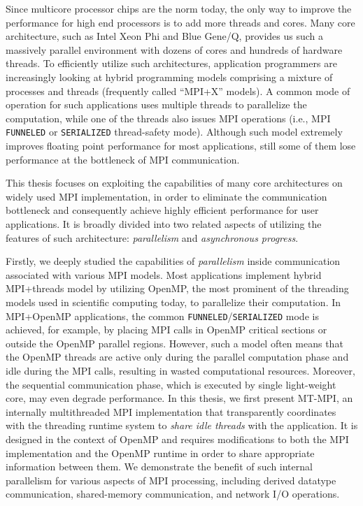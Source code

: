 Since multicore processor chips are the norm today, the only way to 
improve the performance for high end processors is to add more threads 
and cores. Many core architecture, such as Intel Xeon Phi and Blue Gene/Q, 
provides us such a massively parallel environment with dozens of cores and
hundreds of hardware threads. To efficiently utilize such architectures, 
application programmers are increasingly looking at hybrid programming 
models comprising a mixture of processes and threads (frequently called 
``MPI+X'' models). A common mode of operation for such applications 
uses multiple threads to parallelize the computation, while one of the 
threads also issues MPI operations (i.e., MPI \texttt{FUNNELED} or 
\texttt{SERIALIZED} thread-safety mode). Although such model extremely 
improves floating point performance for most applications, still 
some of them lose performance at the bottleneck of MPI communication.

This thesis focuses on exploiting the capabilities of many core 
architectures on widely used MPI implementation, in order to eliminate
the communication bottleneck and consequently achieve highly efficient 
performance for user applications. It is broadly divided into two related 
aspects of utilizing the features of such architecture: \textit{parallelism}
and \textit{asynchronous progress}.

Firstly, we deeply studied the capabilities of \textit{parallelism} inside 
communication associated with various MPI models. 
Most applications implement hybrid MPI+threads model by 
utilizing OpenMP, the most prominent of the threading models used 
in scientific computing today, to parallelize their computation.
In MPI+OpenMP applications, the common \texttt{FUNNELED}\slash \texttt{SERIALIZED} 
mode is achieved, for example, by placing MPI calls in OpenMP critical 
sections or outside the OpenMP parallel regions. However, such a model 
often means that the OpenMP threads are active only during the parallel 
computation phase and idle during the MPI calls, resulting in wasted 
computational resources. Moreover, the sequential communication phase, 
which is executed by single light-weight core, may even degrade 
performance. In this thesis, we first present MT-MPI, an internally 
multithreaded MPI implementation that transparently coordinates
with the threading runtime system to \textit{share idle threads} with 
the application. It is designed in the context of OpenMP and
requires modifications to both the MPI implementation and the OpenMP
runtime in order to share appropriate information between them. We
demonstrate the benefit of such internal parallelism for various
aspects of MPI processing, including derived datatype communication,
shared-memory communication, and network I/O operations.

